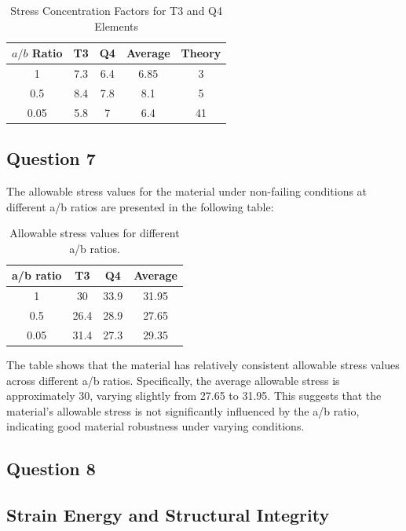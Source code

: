 \documentclass[twoside,twocolumn,10pt]{article}
\begin{document}
\begin{table}[h]
  \centering
  \caption{Stress Concentration Factors for T3 and Q4 Elements}
  \begin{tabular}{|c|c|c|c|c|}
  \hline
  \(a/b\) Ratio & T3 & Q4 & Average & Theory \\
  \hline
  1 & 7.3 & 6.4 & 6.85 & 3 \\
  0.5 & 8.4 & 7.8 & 8.1 & 5 \\
  0.05 & 5.8 & 7 & 6.4 & 41 \\
  \hline
  \end{tabular}
  \label{tab:SCF}
\end{table}

\subsection{Question 7}

The allowable stress values for the material under non-failing conditions at different a/b ratios are presented in the following table:

\begin{table}[H]
\centering
\begin{tabular}{cccc}
\toprule
a/b  ratio & T3 & Q4 & Average \\
\midrule
1           & 30  & 33.9 & 31.95 \\
0.5         & 26.4& 28.9 & 27.65 \\
0.05        & 31.4& 27.3 & 29.35 \\
\bottomrule
\end{tabular}
\caption{Allowable stress values for different a/b ratios.}
\end{table}


The table shows that the material has relatively consistent allowable stress values across different a/b ratios. Specifically, the average allowable stress is approximately 30, varying slightly from 27.65 to 31.95. This suggests that the material's allowable stress is not significantly influenced by the a/b ratio, indicating good material robustness under varying conditions.
\subsection{Question 8}

\subsection*{Strain Energy and Structural Integrity}
\end{document}
